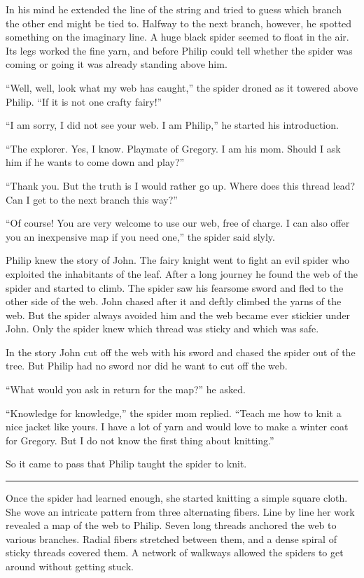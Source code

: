 \documentclass[10pt]{memoir}
\renewcommand{\pfbreakdisplay}{\bigskip \ding{166} \bigskip}
\newcommand{\secbreak}{\fancybreak{\pfbreakdisplay}}
\begin{document}
In his mind he extended the line of the string and tried to guess which branch
the other end might be tied to. Halfway to the next branch, however, he spotted
something on the imaginary line. A huge black spider seemed to float in the
air. Its legs worked the fine yarn, and before Philip could tell whether the
spider was coming or going it was already standing above him.

``Well, well, look what my web has caught,'' the spider droned as it towered
above Philip. ``If it is not one crafty fairy!''

``I am sorry, I did not see your web. I am Philip,'' he started his
introduction.

``The explorer. Yes, I know. Playmate of Gregory. I am his mom. Should I ask
him if he wants to come down and play?''

``Thank you. But the truth is I would rather go up. Where does this thread
lead? Can I get to the next branch this way?''

``Of course! You are very welcome to use our web, free of charge. I can also
offer you an inexpensive map if you need one,'' the spider said slyly.

Philip knew the story of John. The fairy knight went to fight an evil spider
who exploited the inhabitants of the leaf. After a long journey he found the
web of the spider and started to climb. The spider saw his fearsome sword and
fled to the other side of the web. John chased after it and deftly climbed the
yarns of the web. But the spider always avoided him and the web became ever
stickier under John. Only the spider knew which thread was sticky and which was
safe.

In the story John cut off the web with his sword and chased the spider out of
the tree. But Philip had no sword nor did he want to cut off the web.

``What would you ask in return for the map?'' he asked.

``Knowledge for knowledge,'' the spider mom replied. ``Teach me how to knit a
nice jacket like yours. I have a lot of yarn and would love to make a winter
coat for Gregory. But I do not know the first thing about knitting.''

So it came to pass that Philip taught the spider to knit.

\secbreak

Once the spider had learned enough, she started knitting a simple square cloth.
She wove an intricate pattern from three alternating fibers. Line by line her
work revealed a map of the web to Philip. Seven long threads anchored the web
to various branches. Radial fibers stretched between them, and a dense spiral
of sticky threads covered them. A network of walkways allowed the spiders to
get around without getting stuck.
\end{document}
